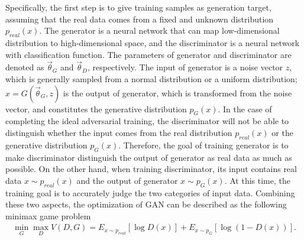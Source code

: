\documentclass{bmcart}
\begin{document}
Specifically, the first step is to give training samples as generation target, assuming that the real data comes from a fixed and unknown distribution ${p_{real}}\left( x \right)$. The generator is a neural network that can map low-dimensional distribution to high-dimensional space, and the discriminator is a neural network with classification function. The parameters of generator and discriminator are denoted as ${\overrightarrow \theta  _G}$ and ${\overrightarrow \theta  _D}$, respectively. The input of generator is a noise vector $z$, which is generally sampled from a normal distribution or a uniform distribution; $x = G\left( {{{\overrightarrow \theta  }_G},z} \right)$ is the output of generator, which is transformed from the noise vector, and constitutes the generative distribution ${p_G}\left( x \right)$. In the case of completing the ideal adversarial training, the discriminator will not be able to distinguish whether the input comes from the real distribution ${p_{real}}\left( x \right)$ or the generative distribution ${p_G}\left( x \right)$. Therefore, the goal of training generator is to make discriminator distinguish the output of generator as real data as much as possible. On the other hand, when training discriminator, its input contains real data $x \sim {p_{real}}\left( x \right)$ and the output of generator $x \sim {p_G}\left( x \right)$. At this time, the training goal is to accurately judge the two categories of input data. Combining these two aspects, the optimization of GAN can be described as the following minimax game problem
%
\begin{eqnarray}\label{eqexpmuts}
\mathop {\min }\limits_G \mathop {\max }\limits_D V\left( {D,G} \right) = {E_{x \sim {p_{real}}}}\left[ {\log D\left( x \right)} \right] + E{}_{x \sim {p_G}}\left[ {\log \left( {1 - D\left( x \right)} \right)} \right].
\end{eqnarray}
%
\end{document}
